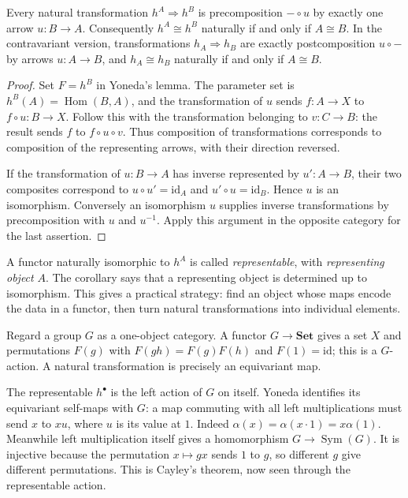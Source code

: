 \begin{corollary}\label{cor:yonedaemb}
Every natural transformation $h^A\Rightarrow h^B$ is precomposition $-\circ u$ by exactly one arrow $u:B\to A$. Consequently $h^A\cong h^B$ naturally if and only if $A\cong B$. In the contravariant version, transformations $h_A\Rightarrow h_B$ are exactly postcomposition $u\circ-$ by arrows $u:A\to B$, and $h_A\cong h_B$ naturally if and only if $A\cong B$.
\end{corollary}

\begin{proof}
Set $F=h^B$ in Yoneda's lemma. The parameter set is $h^B(A)=\operatorname{Hom}(B,A)$, and the transformation of $u$ sends $f:A\to X$ to $f\circ u:B\to X$. Follow this with the transformation belonging to $v:C\to B$: the result sends $f$ to $f\circ u\circ v$. Thus composition of transformations corresponds to composition of the representing arrows, with their direction reversed.

If the transformation of $u:B\to A$ has inverse represented by $u':A\to B$, their two composites correspond to $u\circ u'=\mathrm{id}_A$ and $u'\circ u=\mathrm{id}_B$. Hence $u$ is an isomorphism. Conversely an isomorphism $u$ supplies inverse transformations by precomposition with $u$ and $u^{-1}$. Apply this argument in the opposite category for the last assertion.
\end{proof}

A functor naturally isomorphic to $h^A$ is called \emph{representable}, with \emph{representing object} $A$. The corollary says that a representing object is determined up to isomorphism. This gives a practical strategy: find an object whose maps encode the data in a functor, then turn natural transformations into individual elements.

\begin{example}\label{ex:cayley}
Regard a group $G$ as a one-object category. A functor $G\to\mathbf{Set}$ gives a set $X$ and permutations $F(g)$ with $F(gh)=F(g)F(h)$ and $F(1)=\mathrm{id}$; this is a $G$-action. A natural transformation is precisely an equivariant map.

The representable $h^\bullet$ is the left action of $G$ on itself. Yoneda identifies its equivariant self-maps with $G$: a map commuting with all left multiplications must send $x$ to $xu$, where $u$ is its value at $1$. Indeed $\alpha(x)=\alpha(x\cdot1)=x\alpha(1)$. Meanwhile left multiplication itself gives a homomorphism $G\to\operatorname{Sym}(G)$. It is injective because the permutation $x\mapsto gx$ sends $1$ to $g$, so different $g$ give different permutations. This is Cayley's theorem, now seen through the representable action.
\end{example}

